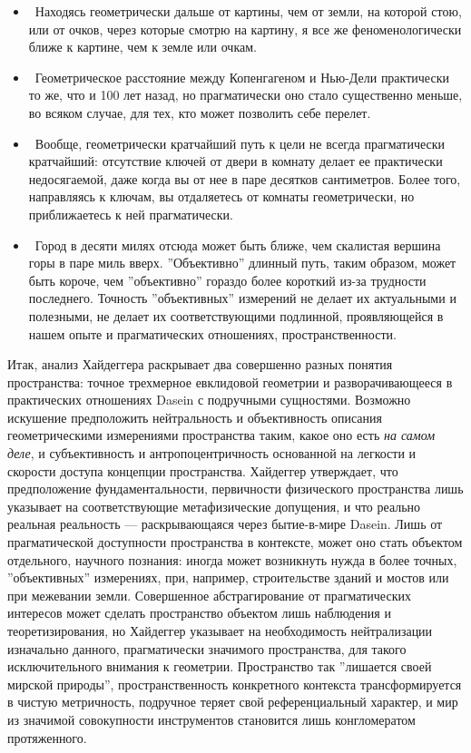 \documentclass[11pt]{book}
\begin{document}
\begin{itemize}
  \item\ Находясь геометрически дальше от картины, чем от земли, на которой стою, или от очков, через которые смотрю на картину, я все же феноменологически ближе к картине, чем к земле или очкам.
  \item\ Геометрическое расстояние между Копенгагеном и Нью-Дели практически то же, что и 100 лет назад, но прагматически оно стало существенно меньше, во всяком случае, для тех, кто может позволить себе перелет.
  \item\ Вообще, геометрически кратчайший путь к цели не всегда прагматически кратчайший: отсутствие ключей от двери в комнату делает ее практически недосягаемой, даже когда вы от нее в паре десятков сантиметров. Более того, направляясь к ключам, вы отдаляетесь от комнаты геометрически, но приближаетесь к ней прагматически.
  \item\ Город в десяти милях отсюда может быть ближе, чем скалистая вершина горы в паре миль вверх. ''Объективно'' длинный путь, таким образом, может быть короче, чем ''объективно'' гораздо более короткий из-за трудности последнего. Точность ''объективных'' измерений не делает их актуальными и полезными, не делает их соответствующими подлинной, проявляющейся в нашем опыте и прагматических отношениях, пространственности.
\end{itemize}

Итак, анализ Хайдеггера раскрывает два совершенно разных понятия пространства: точное трехмерное евклидовой геометрии и разворачивающееся в практических отношениях Dasein с подручными сущностями. Возможно искушение предположить нейтральность и объективность описания геометрическими измерениями пространства таким, какое оно есть \textit{на самом деле}, и субъективность и антропоцентричность основанной на легкости и скорости доступа концепции пространства. Хайдеггер утверждает, что предположение фундаментальности, первичности физического пространства лишь указывает на соответствующие метафизические допущения, и что реально реальная реальность --- раскрывающаяся через бытие-в-мире Dasein. Лишь от прагматической доступности пространства в контексте, может оно стать объектом отдельного, научного познания: иногда может возникнуть нужда в более точных, ''объективных'' измерениях, при, например, строительстве зданий и мостов или при межевании земли. Совершенное абстрагирование от прагматических интересов может сделать пространство объектом лишь наблюдения и теоретизирования, но Хайдеггер указывает на необходимость нейтрализации изначально данного, прагматически значимого пространства, для такого исключительного внимания к геометрии. Пространство так ''лишается своей мирской природы'', пространственность конкретного контекста трансформируется в чистую метричность, подручное теряет свой референциальный характер, и мир из значимой совокупности инструментов становится лишь конгломератом протяженного.
\end{document}
